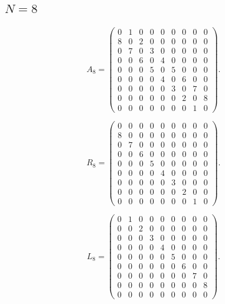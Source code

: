 \subsection{$N=8$}
\label{tab:matrices-N08}
\begingroup
\small
\setlength{\arraycolsep}{3pt}
\[
A_{8}=\begin{pmatrix}
0 & 1 & 0 & 0 & 0 & 0 & 0 & 0 & 0 \\
8 & 0 & 2 & 0 & 0 & 0 & 0 & 0 & 0 \\
0 & 7 & 0 & 3 & 0 & 0 & 0 & 0 & 0 \\
0 & 0 & 6 & 0 & 4 & 0 & 0 & 0 & 0 \\
0 & 0 & 0 & 5 & 0 & 5 & 0 & 0 & 0 \\
0 & 0 & 0 & 0 & 4 & 0 & 6 & 0 & 0 \\
0 & 0 & 0 & 0 & 0 & 3 & 0 & 7 & 0 \\
0 & 0 & 0 & 0 & 0 & 0 & 2 & 0 & 8 \\
0 & 0 & 0 & 0 & 0 & 0 & 0 & 1 & 0
\end{pmatrix}.
\]
\endgroup

\begingroup
\small
\setlength{\arraycolsep}{3pt}
\[
R_{8}=\begin{pmatrix}
0 & 0 & 0 & 0 & 0 & 0 & 0 & 0 & 0 \\
8 & 0 & 0 & 0 & 0 & 0 & 0 & 0 & 0 \\
0 & 7 & 0 & 0 & 0 & 0 & 0 & 0 & 0 \\
0 & 0 & 6 & 0 & 0 & 0 & 0 & 0 & 0 \\
0 & 0 & 0 & 5 & 0 & 0 & 0 & 0 & 0 \\
0 & 0 & 0 & 0 & 4 & 0 & 0 & 0 & 0 \\
0 & 0 & 0 & 0 & 0 & 3 & 0 & 0 & 0 \\
0 & 0 & 0 & 0 & 0 & 0 & 2 & 0 & 0 \\
0 & 0 & 0 & 0 & 0 & 0 & 0 & 1 & 0
\end{pmatrix}.
\]
\endgroup

\begingroup
\small
\setlength{\arraycolsep}{3pt}
\[
L_{8}=\begin{pmatrix}
0 & 1 & 0 & 0 & 0 & 0 & 0 & 0 & 0 \\
0 & 0 & 2 & 0 & 0 & 0 & 0 & 0 & 0 \\
0 & 0 & 0 & 3 & 0 & 0 & 0 & 0 & 0 \\
0 & 0 & 0 & 0 & 4 & 0 & 0 & 0 & 0 \\
0 & 0 & 0 & 0 & 0 & 5 & 0 & 0 & 0 \\
0 & 0 & 0 & 0 & 0 & 0 & 6 & 0 & 0 \\
0 & 0 & 0 & 0 & 0 & 0 & 0 & 7 & 0 \\
0 & 0 & 0 & 0 & 0 & 0 & 0 & 0 & 8 \\
0 & 0 & 0 & 0 & 0 & 0 & 0 & 0 & 0
\end{pmatrix}.
\]
\endgroup

